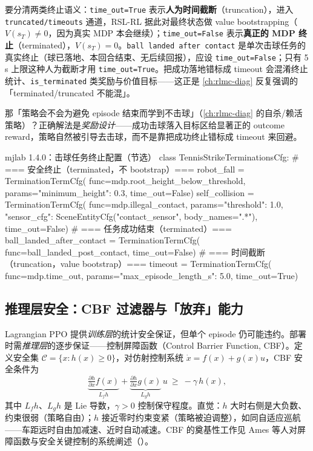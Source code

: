 \begin{insight}\label{ins:rlmc-strike-termination}
要分清两类终止语义：\verb|time_out=True| 表示\textbf{人为时间截断}（truncation），进入 \verb|truncated/timeouts| 通道，RSL-RL 据此对最终状态做 value bootstrapping（$V(s_T)\neq 0$，因为真实 MDP 本会继续）；\verb|time_out=False| 表示\textbf{真正的 MDP 终止}（terminated），$V(s_T)=0$。\verb|ball landed after contact| 是单次击球任务的真实终止（球已落地、本回合结束、无后续回报），应设 \verb|time_out=False|；只有 5\,s 上限这种人为截断才用 \verb|time_out=True|。把成功落地错标成 timeout 会混淆终止统计、\verb|is_terminated| 类奖励与价值目标——这正是 \cref{ch:rlmc-diag} 反复强调的「terminated/truncated 不能混」。
\end{insight}

那「策略会不会为避免 episode 结束而学到不击球」（\cref{ch:rlmc-diag} 的自杀/赖活策略）？正确解法是\emph{奖励设计}——成功击球落入目标区给显著正的 outcome reward，策略自然被引导去击球，而不是靠把成功终止错标成 timeout 来回避。

\begin{codebox}[Python]{mjlab 1.4.0：击球任务终止配置（节选）}
class TennisStrikeTerminationsCfg:
    # === 安全终止（terminated，不 bootstrap）===
    robot_fall = TerminationTermCfg(
        func=mdp.root_height_below_threshold,
        params={"minimum_height": 0.3}, time_out=False)
    self_collision = TerminationTermCfg(
        func=mdp.illegal_contact,
        params={"threshold": 1.0,
                "sensor_cfg": SceneEntityCfg("contact_sensor", body_names=".*")},
        time_out=False)
    # === 任务成功结束（terminated）===
    ball_landed_after_contact = TerminationTermCfg(
        func=ball_landed_post_contact, time_out=False)
    # === 时间截断（truncation，value bootstrap）===
    timeout = TerminationTermCfg(
        func=mdp.time_out,
        params={"max_episode_length_s": 5.0}, time_out=True)
\end{codebox}

\subsection{推理层安全：CBF 过滤器与「放弃」能力}

Lagrangian PPO 提供\emph{训练层}的统计安全保证，但单个 episode 仍可能违约。部署时需\emph{推理层}的逐步保证——控制屏障函数（Control Barrier Function, CBF）。定义安全集 $\mathcal{C}=\{x:h(x)\ge 0\}$，对仿射控制系统 $\dot{x}=f(x)+g(x)u$，CBF 安全条件为
\begin{equation}
\underbrace{\tfrac{\partial h}{\partial x}f(x)}_{L_f h} + \underbrace{\tfrac{\partial h}{\partial x}g(x)}_{L_g h}\,u \ \ge\ -\gamma\, h(x),
\label{eq:rlmc-strike-cbf}
\end{equation}
其中 $L_f h$、$L_g h$ 是 Lie 导数，$\gamma>0$ 控制保守程度。直觉：$h$ 大时右侧是大负数、约束很弱（策略自由）；$h$ 接近零时约束变紧（策略被迫调整），如同自适应巡航——车距远时自由加减速、近时自动减速。CBF 的奠基性工作见 Ames 等人对屏障函数与安全关键控制的系统阐述（\cite{ames2017cbf}）。

